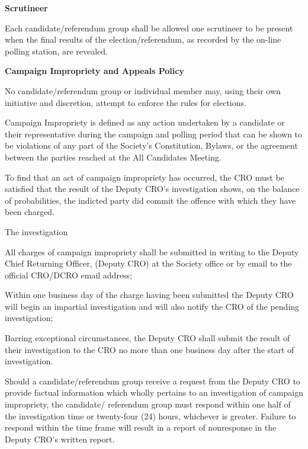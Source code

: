 \begin{longenum}[ label*=\thesection.\arabic*., align=left]
  
 \item \textbf{Scrutineer}
 \begin{longenum}[label*=\arabic*., align=left]
\item Each candidate/referendum group shall be allowed one scrutineer to be present when the final results of the election/referendum, as recorded by the on-line polling station, are revealed.
 \end{longenum}
 \item 	\textbf{Campaign Impropriety and Appeals Policy}	
 \begin{longenum}[label*=\arabic*., align=left]
\item No candidate/referendum group or individual member may, using their own initiative and 
discretion, attempt to enforce the rules for elections.
\item Campaign Impropriety is defined as any action undertaken by a candidate or their representative 
during the campaign and polling period that can be shown to be violations of any part of the Society's 
Constitution, Bylaws, or the agreement between the parties reached at the All Candidates Meeting.
\item To find that an act of campaign impropriety has occurred, the CRO must be satisfied that the result of 
the Deputy CRO's investigation shows, on the balance of probabilities, the indicted party did commit the 
offence with which they have been charged.
\item The investigation
\begin{longenum}[label*=\arabic*., align=left]
\item All charges of campaign impropriety shall be submitted in writing to the Deputy Chief Returning Officer, (Deputy CRO) at the Society office or by email to the official CRO/DCRO email address;
\item Within one business day of the charge having been submitted the Deputy CRO will begin an impartial investigation and will also notify the CRO of the pending investigation; 
\item Barring exceptional circumstances, the Deputy CRO shall submit the result of their investigation to the CRO no more than one business day after the start of investigation.
\end{longenum}
\item Should a candidate/referendum group receive a request from the Deputy CRO to provide factual information which wholly pertains to an investigation of campaign impropriety, the candidate/ referendum group must respond within one half of the investigation time or twenty-four (24) hours, whichever is greater. Failure to respond within the time frame will result in a report of nonresponse in the Deputy CRO's written report.

\end{longenum}
\end{longenum}

